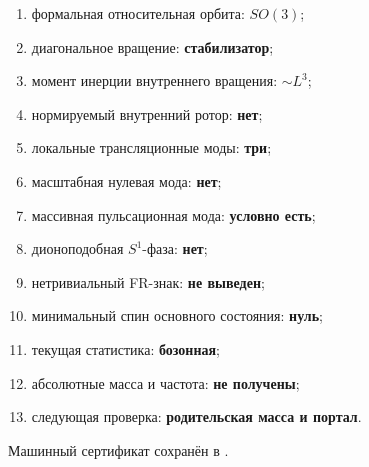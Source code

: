 \begin{protocol}
\begin{enumerate}
 \item формальная относительная орбита: \textbf{$SO(3)$};
 \item диагональное вращение: \textbf{стабилизатор};
 \item момент инерции внутреннего вращения: \textbf{$\sim L^3$};
 \item нормируемый внутренний ротор: \textbf{нет};
 \item локальные трансляционные моды: \textbf{три};
 \item масштабная нулевая мода: \textbf{нет};
 \item массивная пульсационная мода: \textbf{условно есть};
 \item дионоподобная $S^1$-фаза: \textbf{нет};
 \item нетривиальный FR-знак: \textbf{не выведен};
 \item минимальный спин основного состояния: \textbf{нуль};
 \item текущая статистика: \textbf{бозонная};
 \item абсолютные масса и частота: \textbf{не получены};
 \item следующая проверка: \textbf{родительская масса и портал}.
\end{enumerate}
\end{protocol}

Машинный сертификат сохранён в
.